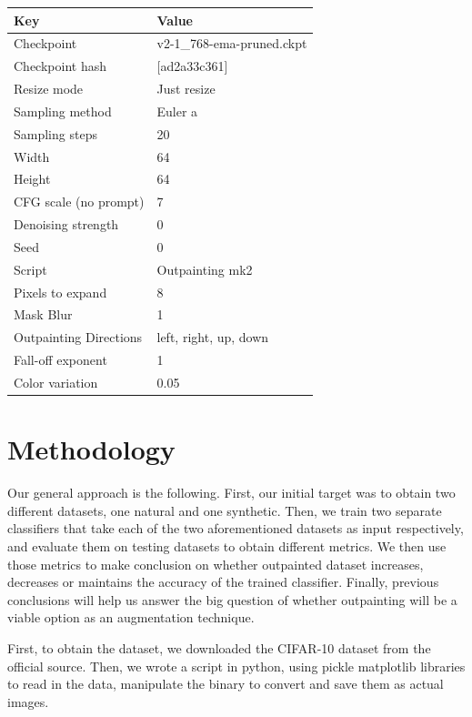 \documentclass[conference]{IEEEtran}
\begin{document}
\begin{center}
\begin{tabular}{|l|l|}
    \hline
    \textbf{Key} & \textbf{Value} \\
    \hline
    Checkpoint & v2-1\_768-ema-pruned.ckpt \\
    Checkpoint hash & [ad2a33c361] \\
    Resize mode & Just resize \\
    Sampling method & Euler a \\
    Sampling steps & 20 \\
    Width & 64 \\
    Height & 64 \\
    CFG scale (no prompt) & 7 \\
    Denoising strength & 0 \\
    Seed & 0 \\
    Script & Outpainting mk2 \\
    Pixels to expand & 8 \\
    Mask Blur & 1 \\
    Outpainting Directions & left, right, up, down \\
    Fall-off exponent & 1 \\
    Color variation & 0.05 \\
    \hline
\end{tabular}
\end{center}

\section{Methodology}

Our general approach is the following. First, our initial target was to obtain two different datasets, one natural and one synthetic. Then, we train two separate classifiers that take each of the two aforementioned datasets as input respectively, and evaluate them on testing datasets to obtain different metrics. We then use those  metrics to make conclusion on whether outpainted dataset increases, decreases or maintains the accuracy of the trained classifier. Finally, previous conclusions will help us answer the big question of whether outpainting will be a viable option as an augmentation technique.

First, to obtain the dataset, we downloaded the CIFAR-10 dataset from the official source. Then, we wrote a script in python, using pickle matplotlib libraries to read in the data, manipulate the binary to convert and save them as actual images.
\end{document}
